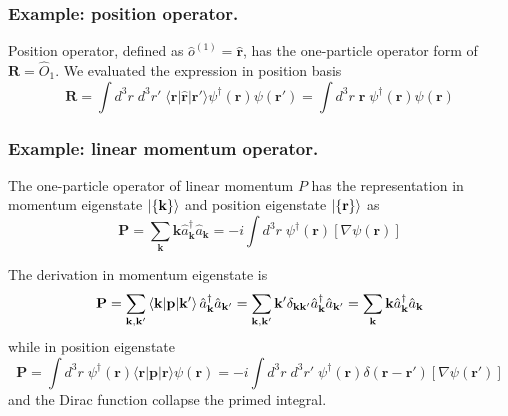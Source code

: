 \documentclass[../../../main.tex]{subfiles}
\begin{document}
\subsubsection{Example: position operator.}
Position operator, defined as $\hat{o }^{(1)}=\mathbf{\hat{r}}$, has the one-particle operator form of $\mathbf{R} = \hat{O}_1$.
We evaluated the expression in position basis
\begin{equation*}
  \mathbf{R} = \int d^3r\;d^3r'\; \langle \mathbf{r}|\hat{\mathbf{r}} |\mathbf{r}'\rangle\psi^\dagger(\mathbf{r})\psi(\mathbf{r}')
  = \int d^3r\;\mathbf{r}\;\psi^\dagger(\mathbf{r})\psi(\mathbf{r})
\end{equation*}

\subsubsection{Example: linear momentum operator.}
The one-particle operator of linear momentum $P$ has the representation in momentum eigenstate $\ket{\left\{ \mathbf{k} \right\} }$ and position eigenstate $\ket{\left\{ \mathbf{r} \right\} }$ as
\begin{equation*}
  \mathbf{P}
  = \sum_{\mathbf{k }} \mathbf{k}  \hat{a}^\dagger_{\mathbf{k }} \hat{a}_{\mathbf{k }}
  =-i \int d^{3}r\; \psi^{\dagger}(\mathbf{r})[\nabla\psi(\mathbf{r})]
\end{equation*}

The derivation in momentum eigenstate is
\begin{equation*}
  \mathbf{P} = \sum_{\mathbf{k },\mathbf{k}'} \braket{\mathbf{k } | \mathbf{p }|\mathbf{k}'} \hat{a}^\dagger_{\mathbf{k }} \hat{a}_{\mathbf{k }'}
  = \sum_{\mathbf{k },\mathbf{k}'} \mathbf{k}' \delta_{\mathbf{k}\mathbf{k}'} \hat{a}^\dagger_{\mathbf{k }} \hat{a}_{\mathbf{k }'}
  = \sum_{\mathbf{k }} \mathbf{k}  \hat{a}^\dagger_{\mathbf{k }} \hat{a}_{\mathbf{k }}
\end{equation*}
while in position eigenstate
\begin{equation*}
  \mathbf{P}
  = \int d^3r\;\psi^\dagger(\mathbf{r}) \langle \mathbf{r}| \mathbf{p} |\mathbf{r}\rangle \psi(\mathbf{r})
  =-i   \int d^3r\;d^3r'\;\psi^\dagger(\mathbf{r})\delta(\mathbf{r}-\mathbf{r'}) [\nabla   \psi(\mathbf{r}')]
\end{equation*}
and the Dirac function collapse the primed integral.
\end{document}
